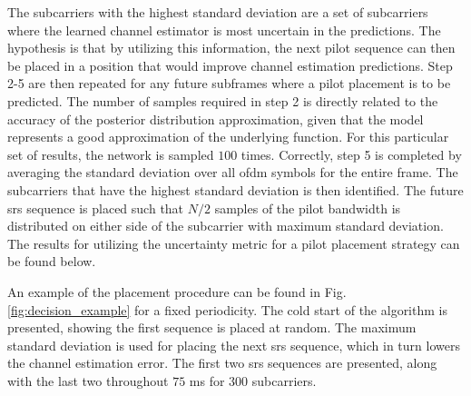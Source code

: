 The subcarriers with the highest standard deviation are a set of subcarriers where the learned channel estimator is most uncertain in the predictions. The hypothesis is that by utilizing this information, the next pilot sequence can then be placed in a position that would improve channel estimation predictions. Step 2-5 are then repeated for any future subframes where a pilot placement is to be predicted. The number of samples required in step 2 is directly related to the accuracy of the posterior distribution approximation, given that the model represents a good approximation of the underlying function. For this particular set of results, the network is sampled $100$ times. Correctly, step 5 is completed by averaging the standard deviation over all \gls{ofdm} symbols for the entire frame. The subcarriers that have the highest standard deviation is then identified. The future \gls{srs} sequence is placed such that $N/2$ samples of the pilot bandwidth is distributed on either side of the subcarrier with maximum standard deviation. The results for utilizing the uncertainty metric for a pilot placement strategy can be found below. 

An example of the placement procedure can be found in Fig. \ref{fig:decision_example} for a fixed periodicity. The cold start of the algorithm is presented,  showing the first sequence is placed at random. The maximum standard deviation is used for placing the next \gls{srs} sequence, which in turn lowers the channel estimation error. The first two  \gls{srs} sequences are presented, along with the last two throughout $75$ ms for $300$ subcarriers. 

